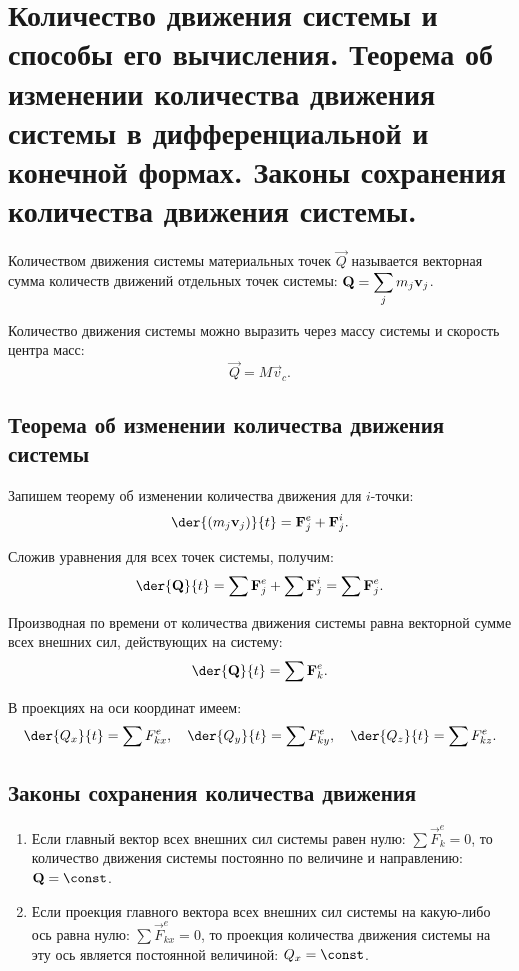 \chapter{Количество движения системы и способы его вычисления. Теорема об
изменении количества движения системы в дифференциальной и конечной
формах. Законы сохранения количества движения системы.}

Количеством движения системы материальных точек \( \vec{Q} \) называется
векторная сумма количеств движений отдельных точек системы:
\( \displaystyle \boldsymbol{\mathrm{Q}} = \sum_j m_j\boldsymbol{\mathrm{v}}_j \).

Количество движения системы можно выразить через массу системы и скорость центра масс:
\[
    \vec{Q} = M\vec{v}_c.
\]

\section{Теорема об изменении количества движения системы}
Запишем теорему об изменении количества движения для \( i \)-точки:
\[
    \der{(m_j\vec{v}_j)}{t} = \vec{F}^e_j + \vec{F}^i_j.
\]

Сложив уравнения для всех точек системы, получим:
\[
    \der{\vec{Q}}{t} = \sum \vec{F}^e_j + \sum \vec{F}^i_j = \sum \vec{F}^e_j.
\]

Производная по времени от количества движения системы равна векторной сумме всех
внешних сил, действующих на систему:
\[
    \der{\vec{Q}}{t} = \sum \vec{F}^e_k.
\]

В проекциях на оси координат имеем:
\[
    \der{Q_x}{t} = \sum F^e_{kx}, \quad \der{Q_y}{t} = \sum F^e_{ky}, \quad
    \der{Q_z}{t} = \sum F^e_{kz}.
\]

\section{Законы сохранения количества движения}
\begin{enumerate}
    \item Если главный вектор всех внешних сил системы равен нулю:
    \( \sum \vec{F}^e_k = 0 \), то количество движения системы постоянно по
    величине и направлению: \( \vec{Q} = \const \).
    \item Если проекция главного вектора всех внешних сил системы на какую-либо
    ось равна нулю: \( \sum \vec{F}^e_{kx} = 0 \), то проекция количества
    движения системы на эту ось является постоянной величиной:
    \( Q_x = \const \).
\end{enumerate}

\newpage

